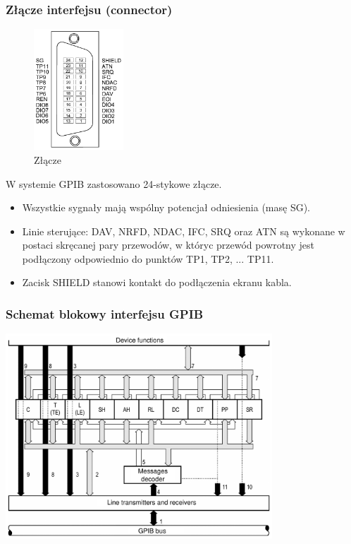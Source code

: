 \subsubsection{Złącze interfejsu (connector)}
\begin{figure}
	\vspace{0pt}
	\begin{center}
		\includegraphics[width=0.30\textwidth]{./wyklady/IEEE488_SCPI_11_1.pdf}
	\end{center}
	\vspace{-20pt}
	\caption{Złącze}
	\vspace{-10pt}
\end{figure}
W systemie GPIB zastosowano 24-stykowe złącze.
\begin{itemize}
	\item Wszystkie sygnały mają wspólny potencjał odniesienia (masę SG).
	\item Linie sterujące: DAV, NRFD, NDAC, IFC, SRQ oraz ATN są wykonane w postaci skręcanej pary przewodów, w któryc przewód powrotny jest podłączony odpowiednio do punktów TP1, TP2, ... TP11.
	\item Zacisk SHIELD stanowi kontakt do podłączenia ekranu kabla.
\end{itemize}

\subsubsection{Schemat blokowy interfejsu GPIB}
\includegraphics[width=10cm]{./wyklady/IEEE488_SCPI_12_1.pdf}

